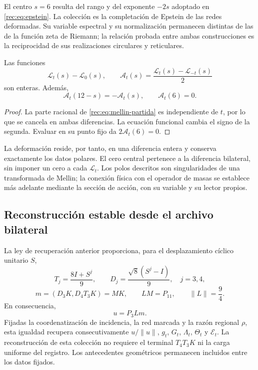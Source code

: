 El centro \(s=6\) resulta del rango y del exponente \(-2s\) adoptado en \eqref{rec:eq:epstein}. La colección es la completación de Epstein de las redes deformadas. Su variable espectral y su normalización permanecen distintas de las de la función zeta de Riemann; la relación probada entre ambas construcciones es la reciprocidad de sus realizaciones circulares y reticulares.

\begin{corollary}
\label{rec:cor:polar}
Las funciones
\[
 \mathcal L_t(s)-\mathcal L_0(s),\qquad
 \mathcal A_t(s)=\frac{\mathcal L_t(s)-\mathcal L_{-t}(s)}2
\]
son enteras. Además,
\[
 \mathcal A_t(12-s)=-\mathcal A_t(s),\qquad \mathcal A_t(6)=0.
\]
\end{corollary}
\begin{proof}
La parte racional de \eqref{rec:eq:mellin-partida} es independiente de \(t\), por lo que se cancela en ambas diferencias. La ecuación funcional cambia el signo de la segunda. Evaluar en su punto fijo da \(2\mathcal A_t(6)=0\).
\end{proof}

La deformación reside, por tanto, en una diferencia entera y conserva exactamente los datos polares. El cero central pertenece a la diferencia bilateral, sin imponer un cero a cada \(\mathcal L_t\). Los polos descritos son singularidades de una transformada de Mellin; la conexión física con el operador de masas se establece más adelante mediante la sección de acción, con su variable y su lector propios.

\subsection{Reconstrucción estable desde el archivo bilateral}
\label{rec:archivo}

La ley de recuperación anterior proporciona, para el desplazamiento cíclico unitario \(S\),
\[
 T_j=\frac{8I+S^j}{9},\qquad D_j=\frac{\sqrt8(S^j-I)}9,
 \quad j=3,4,
\]
\begin{equation}
 m=(D_3K,D_4T_3K)=MK,\qquad LM=P_{11},\qquad\|L\|=\frac94.
 \label{rec:eq:archivo}
\end{equation}
En consecuencia,
\begin{equation}
 u=P_3Lm.
 \label{rec:eq:recuperacion-u}
\end{equation}
Fijadas la coordenatización de incidencia, la red marcada y la razón regional \(\rho\), esta igualdad recupera consecutivamente \(u/\|u\|\), \(g_t\), \(G_t\), \(\Lambda_t\), \(\Theta_t\) y \(\mathcal E_t\). La reconstrucción de esta colección no requiere el terminal \(T_4T_3K\) ni la carga uniforme del registro. Los antecedentes geométricos permanecen incluidos entre los datos fijados.

